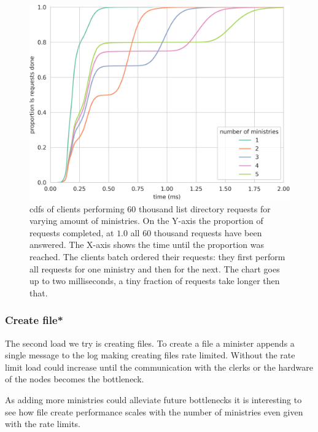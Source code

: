 \begin{figure}[htb]
	\centering
	\includegraphics[height=\textheight]{../results/plots/ls_batch.png}
	\caption{\acp{cdf} of clients performing 60 thousand list directory requests for varying amount of ministries. On the Y-axis the proportion of requests completed, at $1.0$ all 60 thousand requests have been answered. The X-axis shows the time until the proportion was reached. The clients batch ordered their requests: they first perform all requests for one ministry and then for the next. The chart goes up to two milliseconds, a tiny fraction of requests take longer then that.}
	\label{fig:ls_cdf}
\end{figure}

\clearpage{}
\subsubsection{Create file*}
The second load we try is creating files. To create a file a minister appends a single message to the log making creating files rate limited. Without the rate limit load could increase until the communication with the clerks or the hardware of the nodes becomes the bottleneck.%

As adding more ministries could alleviate future bottlenecks it is interesting to see how file create performance scales with the number of ministries even given with the rate limits.

